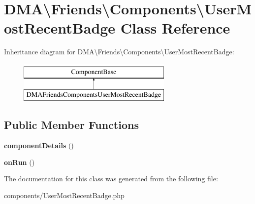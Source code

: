 \hypertarget{classDMA_1_1Friends_1_1Components_1_1UserMostRecentBadge}{\section{D\+M\+A\textbackslash{}Friends\textbackslash{}Components\textbackslash{}User\+Most\+Recent\+Badge Class Reference}
\label{classDMA_1_1Friends_1_1Components_1_1UserMostRecentBadge}
}
Inheritance diagram for D\+M\+A\textbackslash{}Friends\textbackslash{}Components\textbackslash{}User\+Most\+Recent\+Badge\+:\begin{figure}[H]
\begin{center}
\leavevmode
\includegraphics[height=2.000000cm]{d7/d5f/classDMA_1_1Friends_1_1Components_1_1UserMostRecentBadge}
\end{center}
\end{figure}
\subsection*{Public Member Functions}
\begin{DoxyCompactItemize}
\item 
\hypertarget{classDMA_1_1Friends_1_1Components_1_1UserMostRecentBadge_af1a08876aa0dd5462363a71e4624e085}{{\bfseries component\+Details} ()}\label{classDMA_1_1Friends_1_1Components_1_1UserMostRecentBadge_af1a08876aa0dd5462363a71e4624e085}

\item 
\hypertarget{classDMA_1_1Friends_1_1Components_1_1UserMostRecentBadge_a8344e51d141173d907bf02bddec92635}{{\bfseries on\+Run} ()}\label{classDMA_1_1Friends_1_1Components_1_1UserMostRecentBadge_a8344e51d141173d907bf02bddec92635}

\end{DoxyCompactItemize}


The documentation for this class was generated from the following file\+:\begin{DoxyCompactItemize}
\item 
components/User\+Most\+Recent\+Badge.\+php\end{DoxyCompactItemize}
